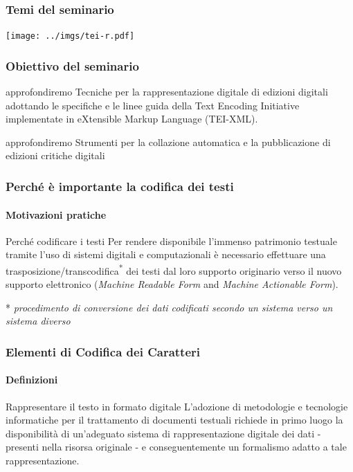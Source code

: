 \documentclass{beamer}
\begin{document}
\begin{frame}
	\frametitle{Temi del seminario}
	\addtocounter{nframe}{1}

	\begin{center}
		\texttt{[image: ../imgs/tei-r.pdf]}
	\end{center}

\end{frame}

\begin{frame}
	\frametitle{Obiettivo del seminario}
	\addtocounter{nframe}{1}

	\begin{block}{approfondiremo}
		Tecniche per la rappresentazione digitale di edizioni digitali adottando le specifiche e le linee guida della Text Encoding Initiative implementate in eXtensible Markup Language (TEI-XML).
	\end{block}
	\begin{block}{approfondiremo}
		Strumenti per la collazione automatica e la pubblicazione di edizioni critiche digitali
	\end{block}

\end{frame}

\begin{frame}
    \frametitle{Perché è importante la codifica dei testi}
    \framesubtitle{Motivazioni pratiche}
    \addtocounter{nframe}{1}
    
    \begin{block}{Perché codificare i testi}
        Per rendere disponibile l'immenso patrimonio testuale tramite l'uso di sistemi digitali e computazionali è necessario effettuare una trasposizione/transcodifica\textsuperscript{*} dei testi dal loro supporto originario verso il nuovo supporto elettronico (\textit{Machine Readable Form} and \textit{Machine Actionable Form}).
    \end{block}

    \begin{center}
        * \textit{procedimento di conversione dei dati codificati secondo un sistema verso un sistema diverso}
    \end{center}

\end{frame}

\begin{frame}
	\frametitle{Elementi di Codifica dei Caratteri}
	\framesubtitle{Definizioni}
	\addtocounter{nframe}{1}

	\begin{block}{Rappresentare il testo in formato digitale}
		L’adozione di metodologie e tecnologie informatiche per il trattamento di documenti testuali richiede in primo luogo la disponibilità di un'adeguato sistema di rappresentazione digitale dei dati - presenti nella risorsa originale - e conseguentemente un formalismo adatto a tale rappresentazione.
	\end{block}

\end{frame}
\end{document}
